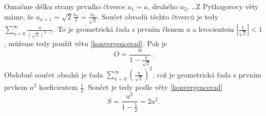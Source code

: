 \begin{reseni}
	Označme délku strany prvního čtverce $a_1=a$, druhého $a_2$, \dots Z Pythagorovy věty máme, že
	$a_{n+1}=\sqrt{2} \frac{a_n}{2} = \frac{a_n}{\sqrt{2}}$. Součet obvodů těchto čtverců je tedy
	$\sum_{n=0} ^\infty \frac{a}{\left( \sqrt{2} \right )^{n-1} }$. To je geometrická řada s prvním členem
	$a$ a kvocientem $\left |\frac{1}{\sqrt{2}}\right | < 1$, můžeme tedy použít větu \ref{konvergencerad}.
	Pak je
	$$
	    O = \frac{a}{1- \frac{1}{\sqrt{2}}}.
	$$
	Obdobně součet obsahů je řada $\sum_{n=0}^\infty \left( \frac{a }{\sqrt{2}} \right )^2 $, což je geometrická
	řada s prvním prvkem $a^2$ koeficientem $\frac{1}{2}$. Součet je tedy podle věty \ref {konvergencerad}
	$$
	 S = \frac{a^2}{1- \frac{1}{2}} = 2a^2.
	$$
\end{reseni}
